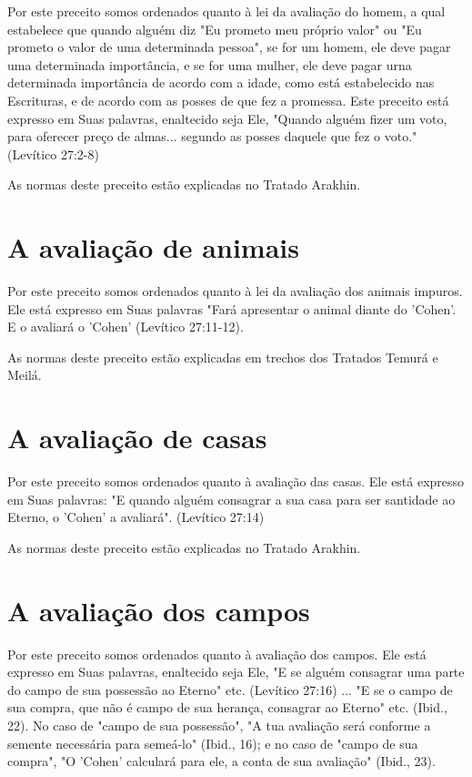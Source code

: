 \begin{itemize}
\begin{enumrate}
\begin{itemize}
\begin{itemize}
Por este preceito somos ordenados quanto à lei da avaliação do ho­mem, a
qual estabelece que quando alguém diz "Eu prometo meu próprio va­lor" ou
"Eu prometo o valor de uma determinada pessoa", se for um homem, ele
deve pagar uma determinada importância, e se for uma mulher, ele deve
pagar urna determinada importância de acordo com a idade, como está
estabe­lecido nas Escrituras, e de acordo com as posses de que fez a
promessa. Este preceito está expresso em Suas palavras, enaltecido seja
Ele, "Quando alguém fizer um voto, para oferecer preço de almas...
segundo as posses daquele que fez o voto." (Levítico 27:2-8)


As normas deste preceito estão explicadas no Tratado Arakhin.


\section{A avaliação de animais}

Por este preceito somos ordenados quanto à lei da avaliação dos ani­mais
impuros. Ele está expresso em Suas palavras "Fará apresentar o animal
dian­te do 'Cohen'. E o avaliará o 'Cohen' (Levítico 27:11-12).

As normas deste preceito estão explicadas em trechos dos Tratados Temurá
e Meilá.

\section{A avaliação de casas}

Por este preceito somos ordenados quanto à avaliação das casas. Ele está
expresso em Suas palavras: "E quando alguém consagrar a sua casa para
ser santidade ao Eterno, o 'Cohen' a avaliará". (Levítico 27:14)

As normas deste preceito estão explicadas no Tratado Arakhin.

\section{A avaliação dos campos}

Por este preceito somos ordenados quanto à avaliação dos campos. Ele
está expresso em Suas palavras, enaltecido seja Ele, "E se alguém
consagrar uma parte do campo de sua possessão ao Eterno" etc. (Levítico
27:16) ... "E se o campo de sua compra, que não é campo de sua herança,
consagrar ao Eterno" etc. (Ibid., 22). No caso de "campo de sua
possessão", "A tua avaliação será con­forme a semente necessária para
semeá-lo" (Ibid., 16); e no caso de "campo de sua compra", "O 'Cohen'
calculará para ele, a conta de sua avaliação" (Ibid., 23).


\end{itemize}
\end{itemize}
\end{enumrate}
\end{itemize}
